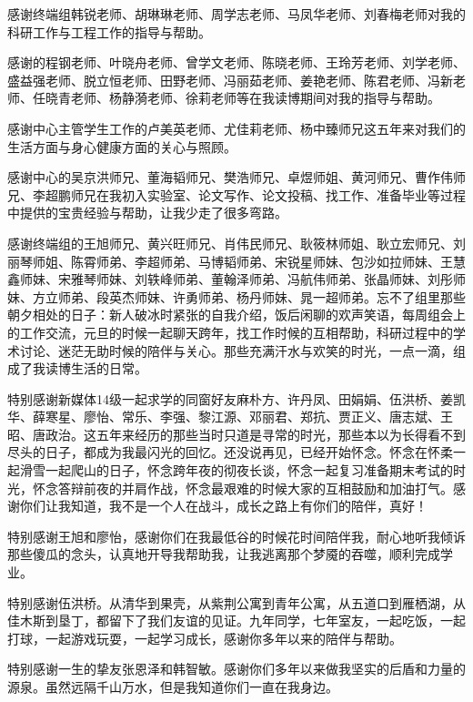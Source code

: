 感谢终端组韩锐老师、胡琳琳老师、周学志老师、马凤华老师、刘春梅老师对我的科研工作与工程工作的指导与帮助。

感谢的程钢老师、叶晓舟老师、曾学文老师、陈晓老师、王玲芳老师、刘学老师、盛益强老师、脱立恒老师、田野老师、冯丽茹老师、姜艳老师、陈君老师、冯新老师、任晓青老师、杨静漪老师、徐莉老师等在我读博期间对我的指导与帮助。

感谢中心主管学生工作的卢美英老师、尤佳莉老师、杨中臻师兄这五年来对我们的生活方面与身心健康方面的关心与照顾。

感谢中心的吴京洪师兄、董海韬师兄、樊浩师兄、卓煜师姐、黄河师兄、曹作伟师兄、李超鹏师兄在我初入实验室、论文写作、论文投稿、找工作、准备毕业等过程中提供的宝贵经验与帮助，让我少走了很多弯路。

感谢终端组的王旭师兄、黄兴旺师兄、肖伟民师兄、耿筱林师姐、耿立宏师兄、刘丽琴师姐、陈霄师弟、李超师弟、马博韬师弟、宋锐星师妹、包沙如拉师妹、王慧鑫师妹、宋雅琴师妹、刘轶峰师弟、董翰泽师弟、冯航伟师弟、张晶师妹、刘彤师妹、方立师弟、段英杰师妹、许勇师弟、杨丹师妹、晁一超师弟。忘不了组里那些朝夕相处的日子：新人破冰时紧张的自我介绍，饭后闲聊的欢声笑语，每周组会上的工作交流，元旦的时候一起聊天跨年，找工作时候的互相帮助，科研过程中的学术讨论、迷茫无助时候的陪伴与关心。那些充满汗水与欢笑的时光，一点一滴，组成了我读博生活的日常。


特别感谢新媒体14级一起求学的同窗好友麻朴方、许丹凤、田娟娟、伍洪桥、姜凯华、薛寒星、廖怡、常乐、李强、黎江源、邓丽君、郑抗、贾正义、唐志斌、王昭、唐政治。这五年来经历的那些当时只道是寻常的时光，那些本以为长得看不到尽头的日子，都成为我最闪光的回忆。还没说再见，已经开始怀念。怀念在怀柔一起滑雪一起爬山的日子，怀念跨年夜的彻夜长谈，怀念一起复习准备期末考试的时光，怀念答辩前夜的并肩作战，怀念最艰难的时候大家的互相鼓励和加油打气。感谢你们让我知道，我不是一个人在战斗，成长之路上有你们的陪伴，真好！

特别感谢王旭和廖怡，感谢你们在我最低谷的时候花时间陪伴我，耐心地听我倾诉那些傻瓜的念头，认真地开导我帮助我，让我逃离那个梦魇的吞噬，顺利完成学业。

特别感谢伍洪桥。从清华到果壳，从紫荆公寓到青年公寓，从五道口到雁栖湖，从佳木斯到垦丁，都留下了我们友谊的见证。九年同学，七年室友，一起吃饭，一起打球，一起游戏玩耍，一起学习成长，感谢你多年以来的陪伴与帮助。

特别感谢一生的挚友张恩泽和韩智敏。感谢你们多年以来做我坚实的后盾和力量的源泉。虽然远隔千山万水，但是我知道你们一直在我身边。

